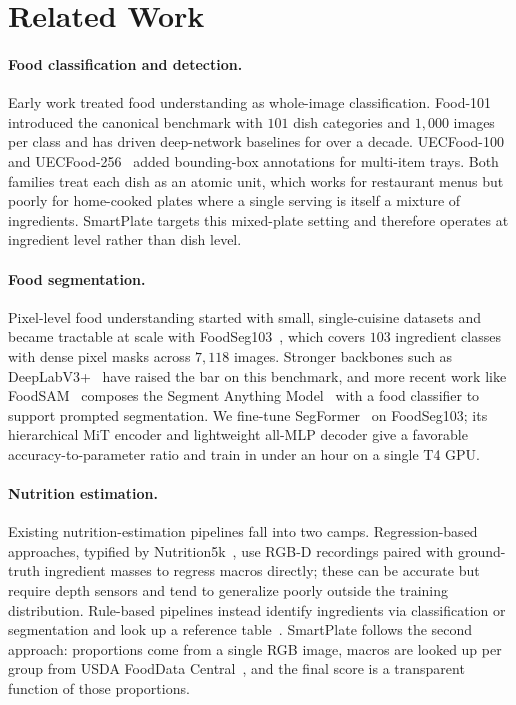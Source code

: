 \section{Related Work}
\label{sec:related}

\paragraph{Food classification and detection.}
Early work treated food understanding as whole-image classification.
Food-101~\cite{bossard2014food101} introduced the canonical benchmark with $101$ dish categories and $1{,}000$ images per class and has driven deep-network baselines for over a decade.
UECFood-100 and UECFood-256~\cite{matsuda2012uecfood} added bounding-box annotations for multi-item trays.
Both families treat each dish as an atomic unit, which works for restaurant menus but poorly for home-cooked plates where a single serving is itself a mixture of ingredients.
SmartPlate targets this mixed-plate setting and therefore operates at ingredient level rather than dish level.

\paragraph{Food segmentation.}
Pixel-level food understanding started with small, single-cuisine datasets and became tractable at scale with FoodSeg103~\cite{wu2021foodseg103}, which covers $103$ ingredient classes with dense pixel masks across $7{,}118$ images.
Stronger backbones such as DeepLabV3+~\cite{chen2018deeplabv3plus} have raised the bar on this benchmark, and more recent work like FoodSAM~\cite{lan2023foodsam} composes the Segment Anything Model~\cite{kirillov2023sam} with a food classifier to support prompted segmentation.
We fine-tune SegFormer~\cite{xie2021segformer} on FoodSeg103; its hierarchical MiT encoder and lightweight all-MLP decoder give a favorable accuracy-to-parameter ratio and train in under an hour on a single T4 GPU.

\paragraph{Nutrition estimation.}
Existing nutrition-estimation pipelines fall into two camps.
Regression-based approaches, typified by Nutrition5k~\cite{thames2021nutrition5k}, use RGB-D recordings paired with ground-truth ingredient masses to regress macros directly; these can be accurate but require depth sensors and tend to generalize poorly outside the training distribution.
Rule-based pipelines instead identify ingredients via classification or segmentation and look up a reference table~\cite{usdafdc}.
SmartPlate follows the second approach: proportions come from a single RGB image, macros are looked up per group from USDA FoodData Central~\cite{usdafdc}, and the final score is a transparent function of those proportions.

